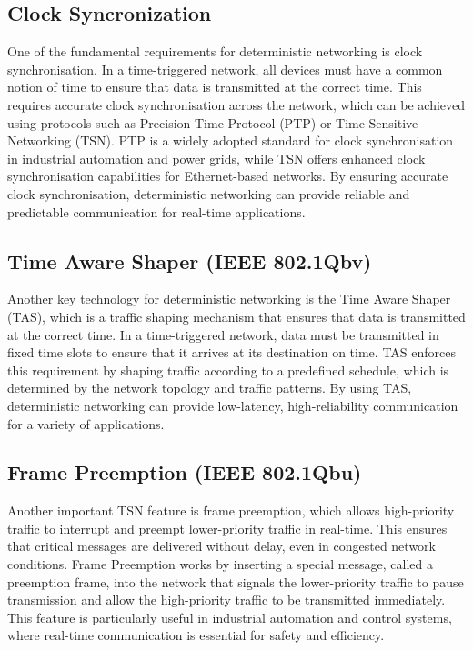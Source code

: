 \documentclass[runningheads]{llncs}
\begin{document}
\subsection*{Clock Syncronization}
One of the fundamental requirements for deterministic networking is clock synchronisation. In a time-triggered network, all devices must have a common notion of time to ensure that data is transmitted at the correct time. This requires accurate clock synchronisation across the network, which can be achieved using protocols such as Precision Time Protocol (PTP) or Time-Sensitive Networking (TSN). PTP is a widely adopted standard for clock synchronisation in industrial automation and power grids, while TSN offers enhanced clock synchronisation capabilities for Ethernet-based networks. By ensuring accurate clock synchronisation, deterministic networking can provide reliable and predictable communication for real-time applications.

\subsection*{Time Aware Shaper (IEEE 802.1Qbv)}
Another key technology for deterministic networking is the Time Aware Shaper (TAS), which is a traffic shaping mechanism that ensures that data is transmitted at the correct time. In a time-triggered network, data must be transmitted in fixed time slots to ensure that it arrives at its destination on time. TAS enforces this requirement by shaping traffic according to a predefined schedule, which is determined by the network topology and traffic patterns. By using TAS, deterministic networking can provide low-latency, high-reliability communication for a variety of applications.

\subsection*{Frame Preemption (IEEE 802.1Qbu)}
Another important TSN feature is frame preemption, which allows high-priority traffic to interrupt and preempt lower-priority traffic in real-time. This ensures that critical messages are delivered without delay, even in congested network conditions. Frame Preemption works by inserting a special message, called a preemption frame, into the network that signals the lower-priority traffic to pause transmission and allow the high-priority traffic to be transmitted immediately. This feature is particularly useful in industrial automation and control systems, where real-time communication is essential for safety and efficiency.
\end{document}
